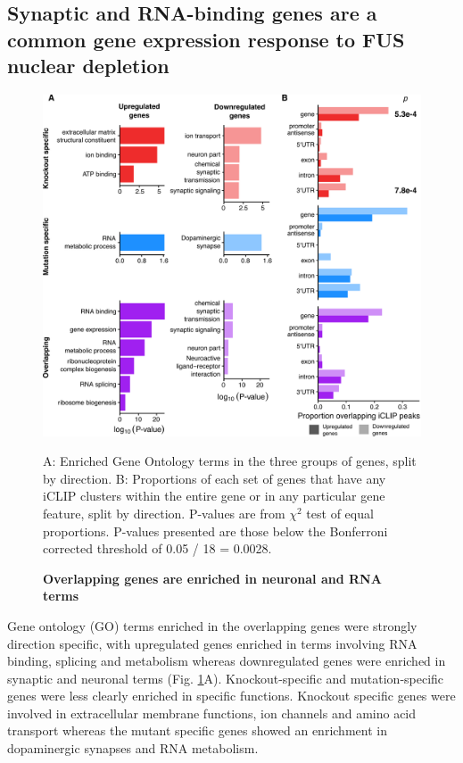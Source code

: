 

\subsection{Synaptic and RNA-binding genes are a common gene expression response to FUS nuclear depletion}

\begin{figure}[h!]
	\centering
	\includegraphics[width=\textwidth]{Figures/06_fus_meta/expression_curated_go_terms.png}
	\caption{\textbf{Overlapping genes are enriched in neuronal and RNA terms} }	
	A: Enriched Gene Ontology terms in the three groups of genes, split by direction.
	B: Proportions of each set of genes that have any iCLIP clusters within the entire gene or in any particular gene feature, split by direction. 
	P-values are from $\chi^2$ test of equal proportions. P-values presented are those below the Bonferroni corrected threshold of 0.05 / 18 = 0.0028. 
	\label{fig:fus_expression_go}
\end{figure}


Gene ontology (GO) terms enriched in the overlapping genes were strongly direction specific, with upregulated genes enriched in terms involving RNA binding, splicing and metabolism whereas downregulated genes were enriched in synaptic and neuronal terms (Fig. \ref{fig:fus_expression_go}A).
Knockout-specific and mutation-specific genes were less clearly enriched in specific functions. 
Knockout specific genes were involved in extracellular membrane functions, ion channels and amino acid transport whereas the mutant specific genes showed an enrichment in dopaminergic synapses and RNA metabolism.


